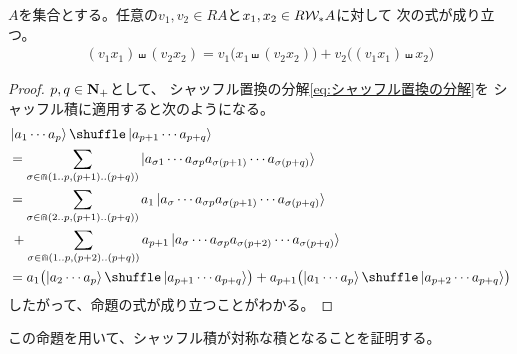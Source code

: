 {	\begin{proposition}[シャッフル積の摂動]\label{prop:シャッフル積の摂動} %
		$A$を集合とする。任意の$v_1,v_2\in RA$と$x_1,x_2\in R{{\mathcal{W}}}_*A$に対して
		次の式が成り立つ。
		\begin{equation*}\begin{split}
			(v_1x_1)\shuffle(v_2x_2) = v_1\bigl(x_1\shuffle(v_2x_2)\bigr) 
				+ v_2\bigl((v_1x_1)\shuffle x_2\bigr)
		\end{split}\end{equation*}
	\end{proposition} %
	\begin{proof} $p,q\in\mathbf{N}_+$として、
	シャッフル置換の分解\eqref{eq:シャッフル置換の分解}を
	シャッフル積に適用すると次のようになる。
	\begin{equation*}\begin{split}
		& \ket{a_1\cdots a_p}\shuffle\ket{a_{p+1}\cdots a_{p+q}} \\
		&= \sum_{\sigma\in\Cap(1..p,(p+1)..(p+q))}
			\ket{a_{\sigma 1}\cdots a_{\sigma p}
			a_{\sigma(p+1)}\cdots a_{\sigma(p+q)}} \\
		&= \sum_{\sigma\in\Cap(2..p,(p+1)..(p+q))}
			a_1\ket{a_{\sigma }\cdots a_{\sigma p}
			a_{\sigma(p+1)}\cdots a_{\sigma(p+q)}} \\
		&\,+ \sum_{\sigma\in\Cap(1..p,(p+2)..(p+q))}
			a_{p+1}\ket{a_{\sigma }\cdots a_{\sigma p}
			a_{\sigma(p+2)}\cdots a_{\sigma(p+q)}} \\
		&= a_{1}\bigl(\ket{a_2\cdots a_p}
			\shuffle\ket{a_{p+1}\cdots a_{p+q}}\bigr)
			+ a_{p+1}\bigl(\ket{a_1\cdots a_p}
			\shuffle\ket{a_{p+2}\cdots a_{p+q}}\bigr)
	\end{split}\end{equation*}
	したがって、命題の式が成り立つことがわかる。
	\end{proof}

	この命題を用いて、シャッフル積が対称な積となることを証明する。

}
